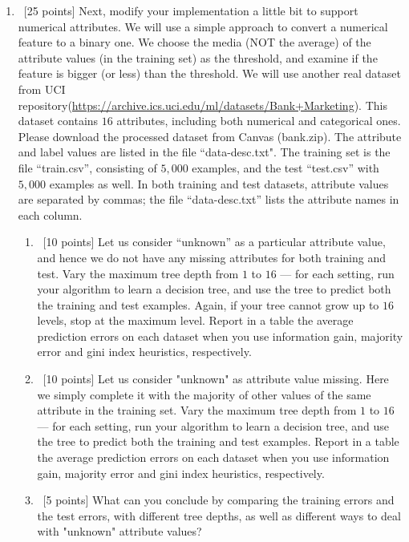 \documentclass[12pt, fullpage,letterpaper]{article}
\begin{document}
\begin{enumerate}
\item~[25 points] Next, modify your implementation a little bit to support numerical attributes. We will use a simple approach to convert a numerical feature to a binary one. We choose the media (NOT the average) of the attribute values (in the training set) as the threshold, and examine if the feature is bigger (or less) than the threshold. We will use another real dataset from UCI repository(\url{https://archive.ics.uci.edu/ml/datasets/Bank+Marketing}). This dataset contains $16$ attributes, including both numerical and categorical ones. Please download the processed dataset from Canvas (bank.zip).  The attribute and label values are listed in the file ``data-desc.txt". The training set is the file ``train.csv'', consisting of $5,000$ examples, and the test  ``test.csv'' with $5,000$ examples as well.  In both training and test datasets, attribute values are separated by commas; the file ``data-desc.txt''  lists the attribute names in each column. 
\begin{enumerate}
	\item~[10 points] Let us consider ``unknown'' as a particular attribute value, and hence we do not have any missing attributes for both training and test. Vary the maximum  tree depth from $1$ to $16$ --- for each setting, run your algorithm to learn a decision tree, and use the tree to  predict both the training  and test examples. Again, if your tree cannot grow up to $16$ levels, stop at the maximum level. Report in a table the average prediction errors on each dataset when you use information gain, majority error and gini index heuristics, respectively.
	
	\item~[10 points] Let us consider "unknown" as  attribute value missing. Here we simply complete it with the majority of other values of the same attribute in the training set.   Vary the maximum  tree depth from $1$ to $16$ --- for each setting, run your algorithm to learn a decision tree, and use the tree to  predict both the training  and test examples. Report in a table the average prediction errors on each dataset when you use information gain, majority error and gini index heuristics, respectively.
	
	
	\item~[5 points] What can you conclude by comparing the training errors and the test errors, with different tree depths, as well as different ways to deal with "unknown" attribute values?
\end{enumerate}
\end{enumerate}
\end{document}
